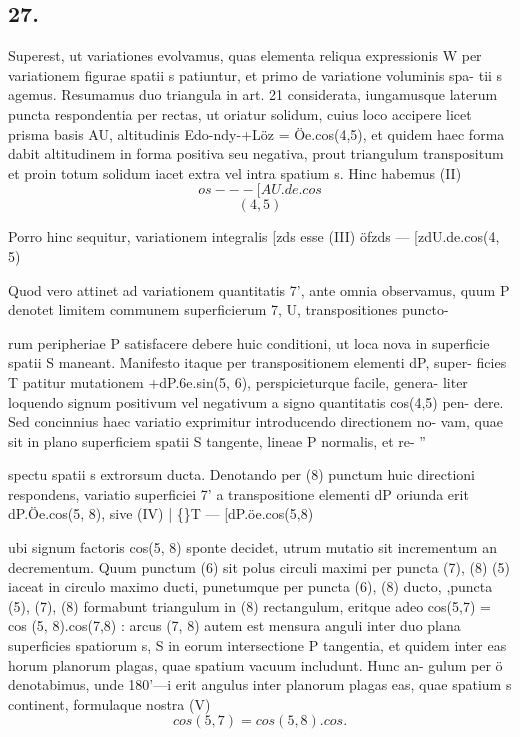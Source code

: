 \documentclass[12pt,a4paper]{article}
\begin{document}
\subsection*{27.}

Superest, ut variationes evolvamus, quas elementa reliqua expressionis W
per variationem figurae spatii s patiuntur, et primo de variatione voluminis spa-
tii s agemus.
Resumamus        duo triangula in art. 21 considerata,          iungamusque laterum
puncta respondentia per rectas, ut oriatur solidum, cuius loco accipere licet prisma
basis AU, altitudinis          Edo-ndy-+Löz = Öe.cos(4,5),            et quidem haec forma
dabit altitudinem in forma positiva seu negativa, prout triangulum transpositum
et proin totum solidum iacet extra vel intra spatium s.              Hinc habemus (II)
\[                                     os --- [AU.de.cos\]
\[                                                   (4, 5)\]

Porro hinc sequitur, variationem integralis [zds esse (III)
öfzds --- [zdU.de.cos(4, 5)

Quod       vero attinet ad variationem     quantitatis    7', ante omnia observamus,
quum P denotet limitem communem superficierum                   7, U, transpositiones puncto-

rum peripheriae P satisfacere debere huic conditioni, ut loca nova in superficie
spatii S maneant. Manifesto itaque per transpositionem elementi dP, super-
ficies T patitur mutationem +dP.6e.sin(5, 6), perspicieturque facile, genera-
liter loquendo signum positivum vel negativum a signo quantitatis cos(4,5) pen-
dere.    Sed concinnius haec variatio exprimitur introducendo directionem no-
vam, quae sit in plano superficiem spatii S tangente, lineae P normalis, et re-
''

spectu spatii s extrorsum ducta.    Denotando per (8) punctum huic directioni
respondens, variatio superficiei    7' a transpositione elementi           dP     oriunda erit
dP.Öe.cos(5, 8), sive (IV)                    |
\textdegree\{\}T --- [dP.öe.cos(5,8)

ubi signum factoris   cos(5, 8) sponte decidet,    utrum mutatio sit incrementum an
decrementum.
Quum punctum         (6) sit polus circuli maximi            per puncta        (7), (8)
(5) iaceat in circulo maximo
ducti, punetumque                                          per puncta       (6), (8)       ducto,
,puncta (5), (7), (8) formabunt triangulum in (8) rectangulum, eritque adeo
cos(5,7) = cos (5, 8).cos(7,8) : arcus (7, 8) autem est mensura anguli inter duo
plana superficies spatiorum s, S in eorum intersectione P tangentia, et quidem
inter eas horum planorum plagas, quae spatium vacuum               includunt.       Hunc an-
gulum per ö denotabimus, unde 180'---i erit angulus inter planorum plagas
eas, quae spatium s continent, formulaque nostra (V)
\[                               cos (5, 7) = cos (5, 8). cos.\]
\end{document}
